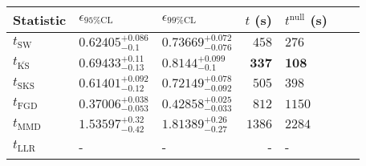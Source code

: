 \begin{tabular}{l|llr|llr}
	Statistic & $\epsilon_{95\%\mathrm{CL}}$ & $\epsilon_{99\%\mathrm{CL}}$ & $t$ (s) & $t^{\mathrm{null}}$ (s) \\
	\midrule
	$t_{\mathrm{SW}}$ & $0.62405_{-0.1}^{+0.086}$ & $0.73669_{-0.076}^{+0.072}$ & $458$ & $276$ \\
	$t_{\overline{\mathrm{KS}}}$ & $0.69433_{-0.13}^{+0.11}$ & $0.8144_{-0.1}^{+0.099}$ & ${\mathbf{337}}$ & ${\mathbf{108}}$ \\
	$t_{\mathrm{SKS}}$ & $0.61401_{-0.12}^{+0.092}$ & $0.72149_{-0.092}^{+0.078}$ & $505$ & $398$ \\
	$t_{\mathrm{FGD}}$ & ${\mathbf{0.37006_{-0.053}^{+0.038}}}$ & ${\mathbf{0.42858_{-0.033}^{+0.025}}}$ & $812$ & $1150$ \\
	$t_{\mathrm{MMD}}$ & $1.53597_{-0.42}^{+0.32}$ & $1.81389_{-0.27}^{+0.26}$ & $1386$ & $2284$ \\
	$t_{\mathrm{LLR}}$ & - & - & - & - \\
	\bottomrule
\end{tabular}